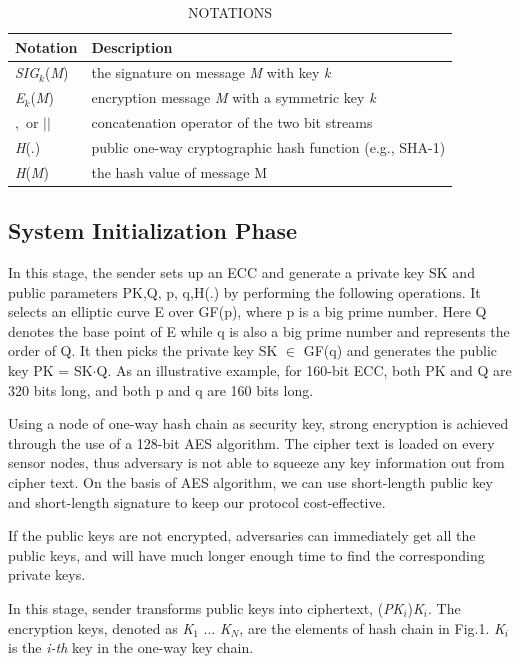\documentclass{sig-alternate-05-2015}
\begin{document}
\begin{table}[t]
\begin{tabular}{l l}

\hline
Notation & Description  \\
\hline
\emph{SIG}$_k$(\emph{M}) &  the signature on message \emph{M} with key \emph{k}  \\
\emph{E}$_k$(\emph{M}) & encryption message \emph{M} with a symmetric key \emph{k}\\

$,$ or $||$ & concatenation operator of the two bit streams\\

\emph{H}(.) & public one-way cryptographic hash function (e.g., SHA-1)\\

\emph{H}(\emph{M}) & the hash value of message M\\
\end{tabular}

\caption{NOTATIONS}

\end{table}

\subsection{System Initialization Phase}
In this stage, the sender sets up an ECC and generate a private key SK and public parameters {PK,Q, p, q,H(.)} by performing the following operations. It selects an elliptic curve E over GF(p), where p is a big prime number. Here Q denotes the base point of E while q is also a big prime number and  represents the order of Q. It then picks the private key SK $\in$ GF(q) and generates the public key PK = SK$\cdot$Q. As an illustrative example, for 160-bit ECC, both PK and Q are 320 bits long, and both p and q are 160 bits long.

Using a node of one-way hash chain as security key, strong encryption is achieved through the use of a 128-bit AES algorithm. The cipher text is loaded on every sensor nodes, thus adversary is not able to squeeze any key information out from cipher text. On the basis of AES algorithm, we can use short-length public key and short-length signature to keep our protocol cost-effective.     

If the public keys are not encrypted, adversaries can immediately get all the public keys, and will have much longer enough time to find the corresponding private keys.

In this stage, sender transforms public keys into ciphertext, (\emph{PK$_i$})\emph{K$_i$}. The encryption keys, denoted as \emph{K$_1$} ... \emph{K$_N$}, are the elements of hash chain in Fig.1. \emph{K$_i$} is the \emph{i-th} key in the one-way key chain.  
\end{document}
